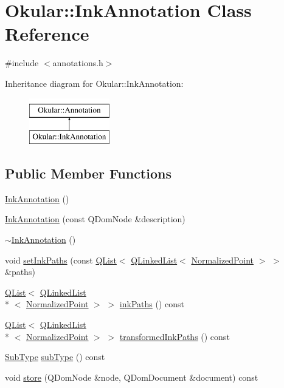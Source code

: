 \hypertarget{classOkular_1_1InkAnnotation}{\section{Okular\+:\+:Ink\+Annotation Class Reference}
\label{classOkular_1_1InkAnnotation}
}


{\ttfamily \#include $<$annotations.\+h$>$}

Inheritance diagram for Okular\+:\+:Ink\+Annotation\+:\begin{figure}[H]
\begin{center}
\leavevmode
\includegraphics[height=2.000000cm]{classOkular_1_1InkAnnotation}
\end{center}
\end{figure}
\subsection*{Public Member Functions}
\begin{DoxyCompactItemize}
\item 
\hyperlink{classOkular_1_1InkAnnotation_a85ef250f28d7623298943eb386d11a3e}{Ink\+Annotation} ()
\item 
\hyperlink{classOkular_1_1InkAnnotation_a00f562b4d954b7894f3adca280fdbaed}{Ink\+Annotation} (const Q\+Dom\+Node \&description)
\item 
\hyperlink{classOkular_1_1InkAnnotation_ac06bac347aff970bc0387a80bd4491e7}{$\sim$\+Ink\+Annotation} ()
\item 
void \hyperlink{classOkular_1_1InkAnnotation_a8d347e99fa554b3024035c51421aeeea}{set\+Ink\+Paths} (const \hyperlink{classQList}{Q\+List}$<$ \hyperlink{classQLinkedList}{Q\+Linked\+List}$<$ \hyperlink{classOkular_1_1NormalizedPoint}{Normalized\+Point} $>$ $>$ \&paths)
\item 
\hyperlink{classQList}{Q\+List}$<$ \hyperlink{classQLinkedList}{Q\+Linked\+List}\\*
$<$ \hyperlink{classOkular_1_1NormalizedPoint}{Normalized\+Point} $>$ $>$ \hyperlink{classOkular_1_1InkAnnotation_a70af1124d2ed92e1e64779423278d707}{ink\+Paths} () const 
\item 
\hyperlink{classQList}{Q\+List}$<$ \hyperlink{classQLinkedList}{Q\+Linked\+List}\\*
$<$ \hyperlink{classOkular_1_1NormalizedPoint}{Normalized\+Point} $>$ $>$ \hyperlink{classOkular_1_1InkAnnotation_aaefc02004360e97d31919ea1516ab736}{transformed\+Ink\+Paths} () const 
\item 
\hyperlink{classOkular_1_1Annotation_af71b46e37d5f850b97d5c4de3be9aac0}{Sub\+Type} \hyperlink{classOkular_1_1InkAnnotation_a6298328b432ec24f985373dbe44798e6}{sub\+Type} () const 
\item 
void \hyperlink{classOkular_1_1InkAnnotation_a28a789210c1c90a74385f37aaf194573}{store} (Q\+Dom\+Node \&node, Q\+Dom\+Document \&document) const 
\end{DoxyCompactItemize}
